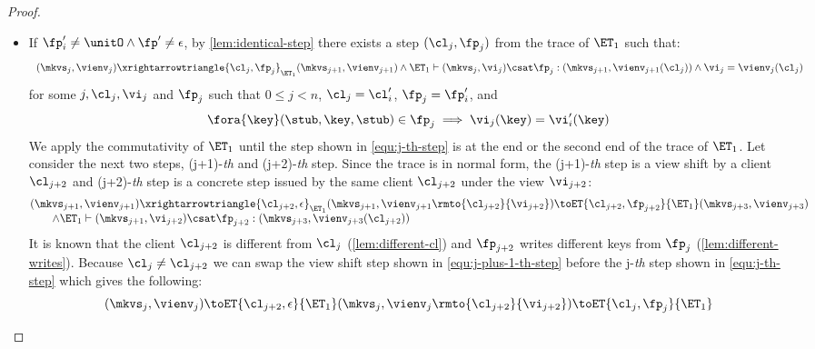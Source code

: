 \begin{proof}
\begin{itemize}
\begin{itemize}
    \item If \( \fp'_i \neq \unitO  \land \fp' \neq \epsilon \), by \cref{lem:identical-step} there exists a step \( (\cl_j, \fp_j) \) from the trace of \( \ET_1 \) such that:
\begin{equation}
    \label{equ:j-th-step}
    \begin{array}{l}
    (\mkvs_{j}, \vienv_{j}) \xrightarrowtriangle{\cl_{j}, \fp_{j}}_{\ET_1} (\mkvs_{j + 1}, \vienv_{j + 1}) 
    \land \ET_1 \vdash (\mkvs_{j}, \vi_j) \csat \fp_j : (\mkvs_{j+1},\vienv_{j + 1}(\cl_{j}) ) \land \vi_j = \vienv_{j}(\cl_j)
\end{array}
\end{equation}
for some \( j, \cl_j, \vi_j\) and \( \fp_j \) such that \( 0 \leq  j < n \), \( \cl_j = \cl'_{i}\), \( \fp_j = \fp'_{i}\), and
\[ 
    \fora{\key} (\stub, \key, \stub ) \in \fp_j \implies \vi_j(\key) = \vi'_{i}(\key)
\]
We apply the commutativity of \( \ET_1 \) until the step shown in \cref{equ:j-th-step} is at the end or the second end of the trace of \( \ET_1 \).
Let consider the next two steps, (j+1)-\emph{th} and (j+2)-\emph{th} step.
Since the trace is in normal form, the (j+1)-\emph{th} step is a view shift by a client \( \cl_{j+2} \) and (j+2)-\emph{th} step is a concrete step issued by the same client \( \cl_{j+2} \) under the view \( \vi_{j+2} \):
\begin{equation}
    \label{equ:j-plus-1-th-step}
    \begin{array}{@{}l@{}}
        (\mkvs_{j+1}, \vienv_{j+1}) \xrightarrowtriangle{\cl_{j+2}, \epsilon}_{\ET_1}
        (\mkvs_{j+1}, \vienv_{j+1}\rmto{\cl_{j+2}}{\vi_{j+2}}) \toET{\cl_{j+2}, \fp_{j+2}}{\ET_1} (\mkvs_{j+3}, \vienv_{j+3}) \\
        \qquad \land \ET_1 \vdash (\mkvs_{j+1},\vi_{j+2}) \csat \fp_{j+2} : (\mkvs_{j+3},\vienv_{j+3}(\cl_{j+2}) )
    \end{array}
\end{equation}
It is known that the client  \( \cl_{j+2} \) is different from \( \cl_j \) (\cref{lem:different-cl}) and \( \fp_{j+2} \) writes different keys from \( \fp_j\) (\cref{lem:different-writes}). 
Because \( \cl_j \neq \cl_{j+2} \) we can swap the view shift step shown in \cref{equ:j-plus-1-th-step} before the j-\emph{th} step shown in \cref{equ:j-th-step} which gives the following:
\begin{equation}
    \label{equ:swap-the-view-shift-et1}
    \begin{array}{@{}l@{}}
    (\mkvs_{j}, \vienv_{j}) \toET{\cl_{j+2}, \epsilon}{\ET_1} (\mkvs_{j}, \vienv_{j}\rmto{\cl_{j+2}}{\vi_{j+2}}) \toET{\cl_{j}, \fp_{j}}{\ET_1} \\

\end{array}
\end{equation}
\end{itemize}
\end{itemize}
\end{proof}
